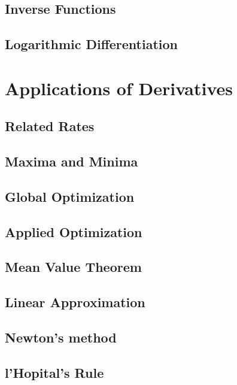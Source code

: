 \documentclass[symmetric,justified,marginals=justified,notoc]{tufte-book}
\theoremstyle{mytheoremstyle}
\begin{document}
\lipsum[31-50]

\section{Inverse Functions}	
\lipsum[31-50]

\section{Logarithmic Differentiation}
\lipsum[31-50]


\chapter{Applications of Derivatives}

 \section{Related Rates}
 \lipsum[31-50]
 
 \section{Maxima and Minima}
 \lipsum[31-50]
 
 \section{Global Optimization}
 \lipsum[31-50]
 
 \section{Applied Optimization}
 \lipsum[31-50]
 
 \section{Mean Value Theorem}
 \lipsum[31-50]
 
 \section{Linear Approximation}	
 \lipsum[31-50]
 
 \section{Newton's method}
 \lipsum[31-50]
 
 \section{l'Hopital's Rule}
 \lipsum[31-50]
\end{document}
